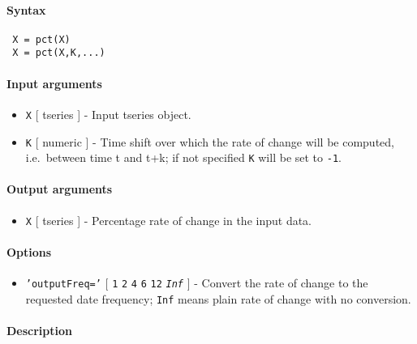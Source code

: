 


	\paragraph{Syntax}
 
 \begin{verbatim}
 X = pct(X)
 X = pct(X,K,...)
 \end{verbatim}
 
 \paragraph{Input arguments}
 
 \begin{itemize}
 \item
   \texttt{X} {[} tseries {]} - Input tseries object.
 \item
   \texttt{K} {[} numeric {]} - Time shift over which the rate of change
   will be computed, i.e.~between time t and t+k; if not specified
   \texttt{K} will be set to \texttt{-1}.
 \end{itemize}
 
 \paragraph{Output arguments}
 
 \begin{itemize}
 \item
   \texttt{X} {[} tseries {]} - Percentage rate of change in the input
   data.
 \end{itemize}
 
 \paragraph{Options}
 
 \begin{itemize}
 \item
   \texttt{'outputFreq='} {[} \texttt{1} \textbar{} \texttt{2} \textbar{}
   \texttt{4} \textbar{} \texttt{6} \textbar{} \texttt{12} \textbar{}
   \emph{\texttt{Inf}} {]} - Convert the rate of change to the requested
   date frequency; \texttt{Inf} means plain rate of change with no
   conversion.
 \end{itemize}
 
 \paragraph{Description}
 
